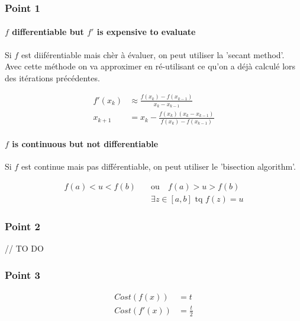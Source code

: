 \subsubsection{Point 1}

\paragraph{$f$ differentiable but $f'$ is expensive to evaluate}

Si $f$ est diiférentiable mais chèr à évaluer, on peut utiliser la 'secant method'. Avec cette méthode on va approximer en ré-utilisant ce qu'on a déjà calculé lors des itérations précédentes.

\begin{equation}
	\begin{aligned}
		f'(x_k) &\approx \frac{f(x_k) - f(x_{k-1})}{x_k-x_{k-1}}\\
		x_{k+1} &= x_k - \frac{f(x_k)(x_k-x_{k-1})}{f(x_k)-f(x_{k-1})}
	\end{aligned}
\end{equation}

\paragraph{$f$ is continuous but not differentiable}

Si $f$ est continue mais pas différentiable, on peut utiliser le 'bisection algorithm'.

\begin{equation}
	\begin{aligned}
		f(a) < u < f(b)\quad &\text{ou} \quad f(a) > u > f(b)\\
		&\exists z \in [a, b] \text{ tq } f(z) = u
	\end{aligned}
\end{equation}

\subsubsection{Point 2}

// TO DO

\subsubsection{Point 3}

\begin{equation}
	\begin{aligned}
		Cost(f(x)) &= t\\
		Cost(f'(x)) &= \frac{t}{2}
	\end{aligned}
\end{equation}

